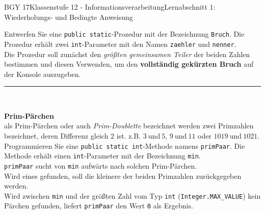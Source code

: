 \documentclass[oneside,openany,headings=optiontotoc,11pt,numbers=noenddot]{scrreprt}
\begin{document}
\begin{worksheet}{BGY 17}{Klassenstufe 12 - Informationsverarbeitung}{Lernabschnitt 1: Wiederholungs- und Bedingte Anweisung}
\begin{framed}
			Entwerfen Sie eine \lstinline[style=JavaInputStyle]|public static|-Prozedur mit der Bezeichnung \lstinline[style=JavaInputStyle]|Bruch|. Die Prozedur erhält zwei \lstinline[style=JavaInputStyle]|int|-Parameter mit den Namen \lstinline[style=JavaInputStyle]|zaehler| und \lstinline[style=JavaInputStyle]|nenner|.\\
			Die Prozedur soll zunächst den \textit{größten gemeinsamen Teiler} der beiden Zahlen bestimmen und diesen Verwenden, um den \textbf{vollständig gekürzten Bruch} auf der Konsole auszugeben.
			\rule{\textwidth}{0.1pt}\\
			\par\noindent
			\textbf{Prim-Pärchen}\\
			als Prim-Pärchen oder auch \textit{Prim-Doublette} bezeichnet werden zwei Primzahlen bezeichnet, deren Differenz gleich \(2\) ist. z.B. \(3\ \text{und}\ 5\), \(9\ \text{und}\ 11\) oder \(1019\ \text{und}\ 1021\).\\
			Programmieren Sie eine \lstinline[style=JavaInputStyle]|public static int|-Methode namens \lstinline[style=JavaInputStyle]|primPaar|. Die Methode erhält einen \lstinline[style=JavaInputStyle]|int|-Parameter mit der Bezeichnung \lstinline[style=JavaInputStyle]|min|.\\
			\lstinline[style=JavaInputStyle]|primPaar| sucht von \lstinline[style=JavaInputStyle]|min| aufwärts nach solchen Prim-Pärchen.\\
			Wird eines gefunden, soll die kleinere der beiden Primzahlen zurückgegeben werden.\\
			Wird zwischen \lstinline[style=JavaInputStyle]|min| und der größten Zahl vom Typ \lstinline[style=JavaInputStyle]|int| (\lstinline[style=JavaInputStyle]|Integer.MAX_VALUE|) kein Pärchen gefunden, liefert \lstinline[style=JavaInputStyle]|primPaar| den Wert \lstinline[style=JavaInputStyle]|0| als Ergebnis.\\
		\end{framed}
	\end{worksheet}
\end{document}
